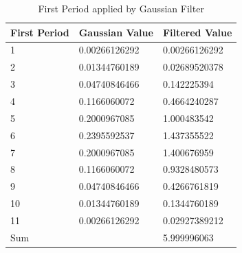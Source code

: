 \documentclass[draft,dvipsnames]{drexel-thesis}
\begin{document}
\begin{thesis}
\begin{table}[!t]
\centering
\caption{First Period applied by Gaussian Filter}
\label{tbl:first_period}
\begin{tabular}{|l|ll|}
\hline
First Period & \multicolumn{1}{l|}{Gaussian Value} & Filtered Value \\ \hline
1            & \multicolumn{1}{l|}{0.00266126292}  & 0.00266126292  \\
2            & \multicolumn{1}{l|}{0.01344760189}  & 0.02689520378  \\
3            & \multicolumn{1}{l|}{0.04740846466}  & 0.142225394    \\
4            & \multicolumn{1}{l|}{0.1166060072}   & 0.4664240287   \\
5            & \multicolumn{1}{l|}{0.2000967085}   & 1.000483542    \\
6            & \multicolumn{1}{l|}{0.2395592537}   & 1.437355522    \\
7            & \multicolumn{1}{l|}{0.2000967085}   & 1.400676959    \\
8            & \multicolumn{1}{l|}{0.1166060072}   & 0.9328480573   \\
9            & \multicolumn{1}{l|}{0.04740846466}  & 0.4266761819   \\
10           & \multicolumn{1}{l|}{0.01344760189}  & 0.1344760189   \\
11           & \multicolumn{1}{l|}{0.00266126292}  & 0.02927389212  \\ \hline
\multicolumn{2}{|l|}{Sum}                          & 5.999996063    \\ \hline
\end{tabular}
\end{table}


\end{thesis}
\end{document}
